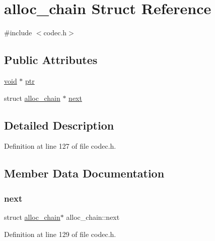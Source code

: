 \hypertarget{structalloc__chain}{}\section{alloc\+\_\+chain Struct Reference}
\label{structalloc__chain}


{\ttfamily \#include $<$codec.\+h$>$}

\subsection*{Public Attributes}
\begin{DoxyCompactItemize}
\item 
\mbox{\hyperlink{_s_d_l__opengles2__gl2ext_8h_ae5d8fa23ad07c48bb609509eae494c95}{void}} $\ast$ \mbox{\hyperlink{structalloc__chain_a564538413768f266bd5bda09d892e99d}{ptr}}
\item 
struct \mbox{\hyperlink{structalloc__chain}{alloc\+\_\+chain}} $\ast$ \mbox{\hyperlink{structalloc__chain_a596f6605e59080015c3c6dfd07326c83}{next}}
\end{DoxyCompactItemize}


\subsection{Detailed Description}


Definition at line 127 of file codec.\+h.



\subsection{Member Data Documentation}
\mbox{\label{structalloc__chain_a596f6605e59080015c3c6dfd07326c83}} 
\subsubsection{\texorpdfstring{next}{next}}
{\footnotesize\ttfamily struct \mbox{\hyperlink{structalloc__chain}{alloc\+\_\+chain}}$\ast$ alloc\+\_\+chain\+::next}



Definition at line 129 of file codec.\+h.

\mbox{\label{structalloc__chain_a564538413768f266bd5bda09d892e99d}} 
